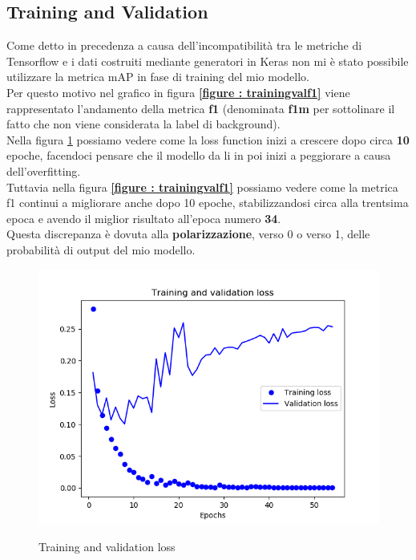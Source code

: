 \subsection{Training and Validation}
Come detto in precedenza a causa dell'incompatibilità tra le metriche di Tensorflow e i dati costruiti mediante generatori in Keras non mi è stato possibile  utilizzare la metrica mAP in fase di training del mio modello.
\\Per questo motivo nel grafico in figura \textbf{\ref{figure : trainingvalf1}} viene rappresentato l'andamento della metrica \textbf{f1} (denominata \textbf{f1m} per sottolinare il fatto che non viene considerata la label di background).
\\Nella figura \ref{figure : trainingvalloss} possiamo vedere come la loss function inizi a crescere dopo circa \textbf{10} epoche, facendoci pensare che il modello da li in poi inizi a peggiorare a causa dell'overfitting.
\\Tuttavia nella figura \textbf{\ref{figure : trainingvalf1}} possiamo vedere come la metrica f1 continui a migliorare anche dopo 10 epoche, stabilizzandosi circa alla trentsima epoca e avendo il miglior risultato all'epoca numero \textbf{34}.
\\Questa discrepanza è dovuta alla \textbf{polarizzazione}, verso 0 o verso 1, delle probabilità di output del mio modello.
\begin{figure}[ht]
\centering
\caption{Training and validation loss}
\includegraphics[width=\linewidth]{img/training-validation-loss.png}
\label{figure : trainingvalloss}
\end{figure}

